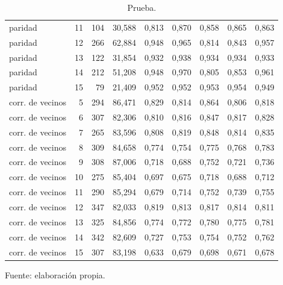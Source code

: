 \begin{table}[htbp]
{\begin{tabular}{@{}lrrrrrrrr@{}}
        paridad & 11 & 104 & 30,588 & 0,813 & 0,870 & 0,858 & 0,865 & 0,863 \\
        paridad & 12 & 266 & 62,884 & 0,948 & 0,965 & 0,814 & 0,843 & 0,957 \\
        paridad & 13 & 122 & 31,854 & 0,932 & 0,938 & 0,934 & 0,934 & 0,933 \\
        paridad & 14 & 212 & 51,208 & 0,948 & 0,970 & 0,805 & 0,853 & 0,961 \\
        paridad & 15 & 79 & 21,409 & 0,952 & 0,952 & 0,953 & 0,954 & 0,949 \\
        corr. de vecinos & 5 & 294 & 86,471 & 0,829 & 0,814 & 0,864 & 0,806 & 0,818 \\
        corr. de vecinos & 6 & 307 & 82,306 & 0,810 & 0,816 & 0,847 & 0,817 & 0,828 \\
        corr. de vecinos & 7 & 265 & 83,596 & 0,808 & 0,819 & 0,848 & 0,814 & 0,835 \\
        corr. de vecinos & 8 & 309 & 84,658 & 0,774 & 0,754 & 0,775 & 0,768 & 0,783 \\
        corr. de vecinos & 9 & 308 & 87,006 & 0,718 & 0,688 & 0,752 & 0,721 & 0,736 \\
        corr. de vecinos & 10 & 275 & 85,404 & 0,697 & 0,675 & 0,718 & 0,688 & 0,712 \\
        corr. de vecinos & 11 & 290 & 85,294 & 0,679 & 0,714 & 0,752 & 0,739 & 0,755 \\
        corr. de vecinos & 12 & 347 & 82,033 & 0,819 & 0,813 & 0,817 & 0,814 & 0,811 \\
        corr. de vecinos & 13 & 325 & 84,856 & 0,774 & 0,772 & 0,780 & 0,775 & 0,781 \\
        corr. de vecinos & 14 & 342 & 82,609 & 0,727 & 0,753 & 0,754 & 0,752 & 0,762 \\
        corr. de vecinos & 15 & 307 & 83,198 & 0,633 & 0,679 & 0,698 & 0,671 & 0,678 \\
        \bottomrule
    \end{tabular}}

    \caption{Prueba.}
    \label{tab:e_tamano_spearman_f}

    {\footnotesize Fuente: elaboración propia.}
\end{table}
